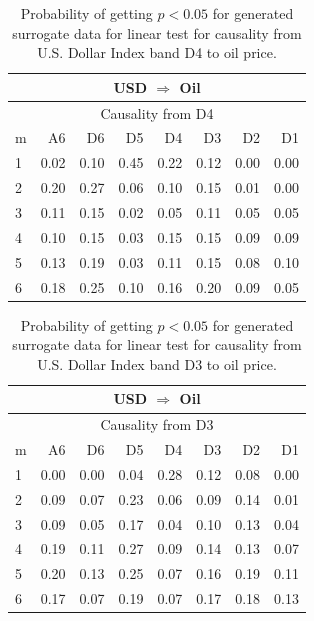 %
%
\begin{table}[H]
\begin{center}
\begin{tabular}{l|r r r r r r r}
\hline\hline
\multicolumn{8}{c}{USD $\Rightarrow$ Oil}\\
\hline
\multicolumn{8}{c}{Causality from D4}\\
\hline\hline
m & A6 & D6 & D5 & D4 & D3 & D2 & D1 \\
\hline
1 & 0.02 & 0.10 & 0.45 & 0.22 & 0.12 & 0.00 & 0.00 \\
2 & 0.20 & \cellcolor{mygrey}0.27 & 0.06 & 0.10 & 0.15 & 0.01 & 0.00 \\
3 & 0.11 & \cellcolor{mygrey}0.15 & 0.02 & 0.05 & 0.11 & 0.05 & 0.05 \\
4 & 0.10 & \cellcolor{mygrey}0.15 & 0.03 & 0.15 & 0.15 & 0.09 & 0.09 \\
5 & 0.13 & \cellcolor{mygrey}0.19 & 0.03 & 0.11 & 0.15 & 0.08 & 0.10 \\
6 & 0.18 & \cellcolor{mygrey}0.25 & 0.10 & 0.16 & 0.20 & 0.09 & 0.05 \\
\hline\hline
\end{tabular}
\caption{Probability of getting $p < 0.05$ for generated surrogate data for linear test for causality from U.S. Dollar Index band D4 to oil price.}
\end{center}
\end{table}

%
%
\begin{table}[H]
\begin{center}
\begin{tabular}{l|r r r r r r r}
\hline\hline
\multicolumn{8}{c}{USD $\Rightarrow$ Oil}\\
\hline
\multicolumn{8}{c}{Causality from D3}\\
\hline\hline
m & A6 & D6 & D5 & D4 & D3 & D2 & D1 \\
\hline
1 & 0.00 & 0.00 & 0.04 & 0.28 & 0.12 & \cellcolor{mygreen}0.08 & 0.00 \\
2 & 0.09 & 0.07 & 0.23 & 0.06 & 0.09 & \cellcolor{mygrey}0.14 & 0.01 \\
3 & 0.09 & 0.05 & 0.17 & 0.04 & 0.10 & \cellcolor{mygrey}0.13 & 0.04 \\
4 & \cellcolor{mygrey}0.19 & 0.11 & 0.27 & 0.09 & 0.14 & \cellcolor{mygrey}0.13 & \cellcolor{mygreen}0.07 \\
5 & \cellcolor{mygrey}0.20 & 0.13 & 0.25 & 0.07 & 0.16 & \cellcolor{mygrey}0.19 & 0.11 \\
6 & \cellcolor{mygrey}0.17 & 0.07 & 0.19 & 0.07 & 0.17 & \cellcolor{mygrey}0.18 & \cellcolor{mygrey}0.13 \\
\hline\hline
\end{tabular}
\caption{Probability of getting $p < 0.05$ for generated surrogate data for linear test for causality from U.S. Dollar Index band D3 to oil price.}
\end{center}
\end{table}


